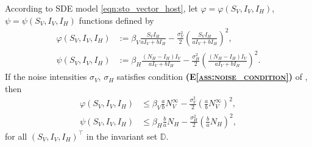 %
%
%
%
\begin{proposition}\label{prp:quadratic_bound}
    According to SDE model \eqref{eqn:sto_vector_host},
    let $\varphi = \varphi (S_V, I_V, I_H)$, 
    $\psi = \psi (S_V, I_V, I_H)$ 
    functions defined by
    \begin{equation}
        \begin{aligned}
            \varphi (S_V, I_V, I_H) &:= 
                \beta_V \frac{S_V I_H}{a I_V + b I_H}
                - 
                \frac{\sigma_V ^ 2}{2} 
                \left(
                    \frac{S_V I_H}{a I_V + b I_H}
                \right) ^2,
            \\
            \psi (S_V, I_V, I_H) &:=
            \beta_H \frac{(N_H - I_H)  I_V}{a I_V + b I_H}
                - 
                \frac{\sigma_H ^ 2}{2} 
                \left(
                    \frac{(N_H - I_H)  I_V}{a I_V + b I_H}
                \right) ^2.
        \end{aligned}
    \end{equation}
    If the noise intensities $\sigma_V$, $\sigma_H$ satisfies condition 
    \textsc{
        \textbf{(E\textendash\ref{ass:noise_condition})}
    }
    of , then
    \begin{equation}
        \begin{aligned}
          \varphi (S_V, I_V, I_H) & \leq \beta_V \frac{a}{b} N_V ^ 
          {\infty}
         - \frac{\sigma_V ^ 2}{2}
          \left(
                  \frac{a}{b} N_V ^ {\infty}
              \right) ^ 2,
          \\
          \psi (S_V, I_V, I_H) & \leq
              \beta_H \frac{b}{a} N_H - \frac{\sigma_H ^ 2}{2}
              \left(
                  \frac{b}{a} N_H
              \right) ^ 2,
        \end{aligned}
    \end{equation}
    for all $(S_V, I_V, I_H)^{\top}$ in the invariant set $\mathbb{D}$.
\end{proposition}
%
